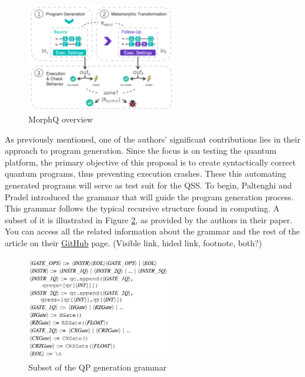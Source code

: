 \begin{itemize}
\begin{figure}[H]
        \centering
        \includegraphics[width=0.58\textwidth]{TFM/photos/MorphQOverview.png}
        \caption{MorphQ overview \cite{paltenghi2023morphq}} 
        \label{Fig:MorphQOverview}
\end{figure}

\vspace{-12pt}
As previously mentioned, one of the authors' significant contributions lies in their approach to program generation. Since the focus is on testing the quantum platform, the primary objective of this proposal is to create syntactically correct quantum programs, thus preventing execution crashes. These this automating generated programs will serve as test suit for the QSS. To begin, Paltenghi and Pradel introduced the grammar that will guide the program generation process. This grammar follows the typical recursive structure found in computing. A subset of it is illustrated in Figure \ref{Fig:MorphQGrammar}, as provided by the authors in their paper. You can access all the related information about the grammar and the rest of the article on their \hyperlink{https://github.com/sola-st/MorphQ-Quantum-Qiskit-Testing-ICSE-23}{GitHub} page. (Visible link, hided link, footnote, both?)

\vspace{-8pt}
\begin{figure}[H]
        \centering
        \includegraphics[width=0.56\textwidth]{TFM/photos/MorphQGrammar.png}
        \caption{Subset of the QP generation grammar \cite{paltenghi2023morphq}} 
        \label{Fig:MorphQGrammar}
\end{figure}


\end{itemize}
